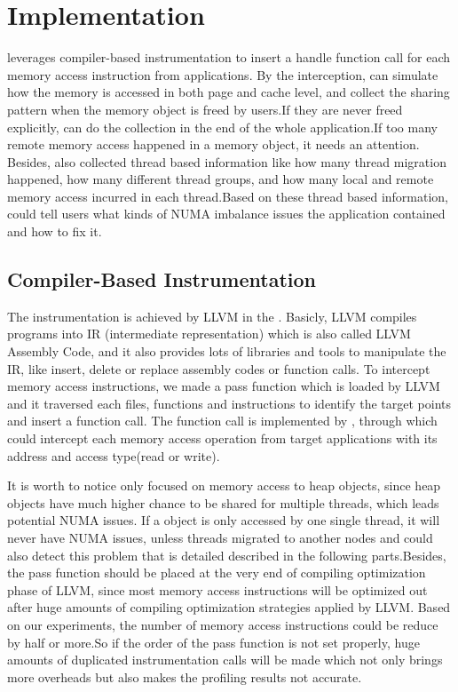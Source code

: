 \section{Implementation}

\NP{} leverages compiler-based instrumentation to insert a handle function call for each memory access instruction from applications. By the interception, \NP{} can simulate how the memory is accessed in both page and cache level, and collect the sharing pattern when the memory object is freed by users.If they are never freed explicitly, \NP{} can do the collection in the end of the whole application.If too many remote memory access happened in a memory object, it needs an attention. Besides, \NP{} also collected thread based information like how many thread migration happened, how many different thread groups, and how many local and remote memory access incurred in each thread.Based on these thread based information, \NP{} could tell users what kinds of NUMA imbalance issues the application contained and how to fix it.

\subsection{Compiler-Based Instrumentation} 
The instrumentation is achieved by LLVM in the \NP{}. Basicly, LLVM compiles programs into IR (intermediate representation) which is also called LLVM Assembly Code, and it also provides lots of libraries and tools to manipulate the IR, like insert, delete or replace assembly codes or function calls.
To intercept memory access instructions, we made a pass function which is loaded by LLVM and it traversed each files, functions and instructions to identify the target points and insert a function call. The function call is implemented by \NP{}, through which \NP{} could intercept each memory access operation from target applications with its address and access type(read or write).

It is worth to notice \NP{} only focused on memory access to heap objects, since heap objects have much higher chance to be shared for multiple threads, which leads potential NUMA issues. If a object is only accessed by one single thread, it will never have NUMA issues, unless threads migrated to another nodes and \NP{} could also detect this problem that is detailed described in the following parts.Besides, the pass function should be placed at the very end of compiling optimization phase of LLVM, since most memory access instructions will be optimized out after huge amounts of compiling optimization strategies applied by LLVM. Based on our experiments, the number of memory access instructions could be reduce by half or more.So if the order of the pass function is not set properly, huge amounts of duplicated instrumentation calls will be made which not only brings more overheads but also makes the profiling results not accurate.

